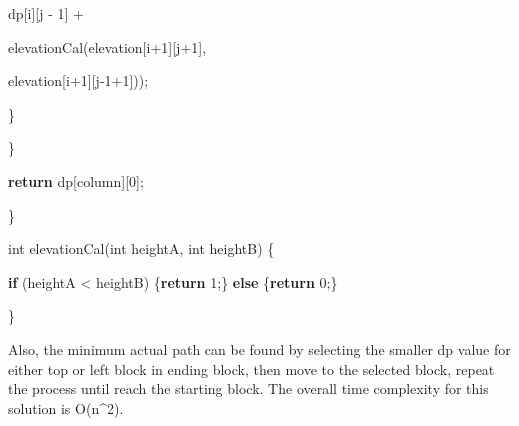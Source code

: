 \documentclass[
]{article}
\newenvironment{Shaded}{}{}
\newcommand{\ControlFlowTok}[1]{\textcolor[rgb]{0.00,0.44,0.13}{\textbf{#1}}}
\newcommand{\DataTypeTok}[1]{\textcolor[rgb]{0.56,0.13,0.00}{#1}}
\newcommand{\DecValTok}[1]{\textcolor[rgb]{0.25,0.63,0.44}{#1}}
\newcommand{\FunctionTok}[1]{\textcolor[rgb]{0.02,0.16,0.49}{#1}}
\newcommand{\NormalTok}[1]{#1}
\newcommand{\OperatorTok}[1]{\textcolor[rgb]{0.40,0.40,0.40}{#1}}
\begin{document}
\begin{Shaded}
\begin{Highlighting}[]
\NormalTok{                                dp}\OperatorTok{[}\NormalTok{i}\OperatorTok{][}\NormalTok{j }\OperatorTok{{-}} \DecValTok{1}\OperatorTok{]} \OperatorTok{+} 

                                \FunctionTok{elevationCal}\OperatorTok{(}\NormalTok{elevation}\OperatorTok{[}\NormalTok{i}\OperatorTok{+}\DecValTok{1}\OperatorTok{][}\NormalTok{j}\OperatorTok{+}\DecValTok{1}\OperatorTok{],} 

\NormalTok{                                             elevation}\OperatorTok{[}\NormalTok{i}\OperatorTok{+}\DecValTok{1}\OperatorTok{][}\NormalTok{j}\OperatorTok{{-}}\DecValTok{1}\OperatorTok{+}\DecValTok{1}\OperatorTok{]));}

        \OperatorTok{\}}

    \OperatorTok{\}}

    \ControlFlowTok{return}\NormalTok{ dp}\OperatorTok{[}\NormalTok{column}\OperatorTok{][}\DecValTok{0}\OperatorTok{];}

\OperatorTok{\}}



\DataTypeTok{int} \FunctionTok{elevationCal}\OperatorTok{(}\DataTypeTok{int}\NormalTok{ heightA}\OperatorTok{,} \DataTypeTok{int}\NormalTok{ heightB}\OperatorTok{)} \OperatorTok{\{}

    \ControlFlowTok{if} \OperatorTok{(}\NormalTok{heightA }\OperatorTok{\textless{}}\NormalTok{ heightB}\OperatorTok{)} \OperatorTok{\{}\ControlFlowTok{return} \DecValTok{1}\OperatorTok{;\}} \ControlFlowTok{else} \OperatorTok{\{}\ControlFlowTok{return} \DecValTok{0}\OperatorTok{;\}}

\OperatorTok{\}}
\end{Highlighting}
\end{Shaded}

Also, the minimum actual path can be found by selecting the smaller dp
value for either top or left block in ending block, then move to the
selected block, repeat the process until reach the starting block. The
overall time complexity for this solution is O(n\^{}2).
\end{document}
